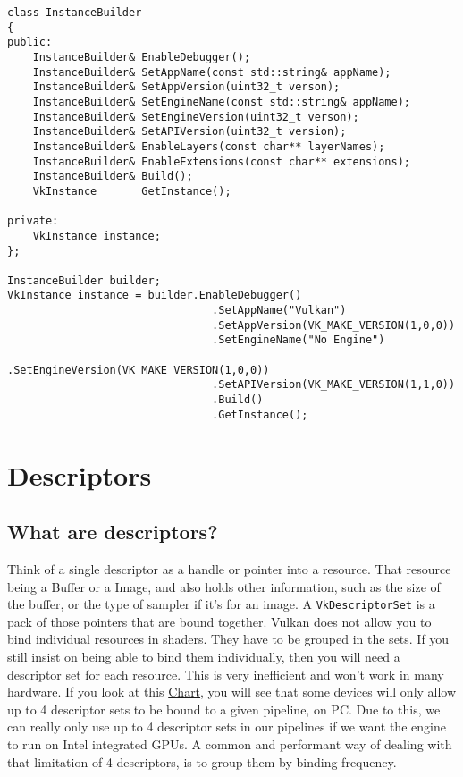 \documentclass[12pt]{article}
\begin{document}
	\begin{lstlisting}[style=customcpp]
class InstanceBuilder
{
public:
	InstanceBuilder& EnableDebugger();
	InstanceBuilder& SetAppName(const std::string& appName);
	InstanceBuilder& SetAppVersion(uint32_t verson);
	InstanceBuilder& SetEngineName(const std::string& appName);
	InstanceBuilder& SetEngineVersion(uint32_t verson);
	InstanceBuilder& SetAPIVersion(uint32_t version);
	InstanceBuilder& EnableLayers(const char** layerNames);
	InstanceBuilder& EnableExtensions(const char** extensions);
	InstanceBuilder& Build();
	VkInstance       GetInstance();

private:
	VkInstance instance;
};

InstanceBuilder builder;
VkInstance instance = builder.EnableDebugger()
								.SetAppName("Vulkan")
								.SetAppVersion(VK_MAKE_VERSION(1,0,0))
								.SetEngineName("No Engine")
								.SetEngineVersion(VK_MAKE_VERSION(1,0,0))
								.SetAPIVersion(VK_MAKE_VERSION(1,1,0))
								.Build()
								.GetInstance();
	\end{lstlisting}

	\newpage
	\section{Descriptors}
	\subsection{What are descriptors?}
	Think of a single descriptor as a handle or pointer into a resource. That resource being a Buffer or a Image, and also holds other information, such as the size of the buffer, or the type of sampler if it's for an image. A \texttt{VkDescriptorSet} is a pack of those pointers that are bound together. Vulkan does not allow you to bind individual resources in shaders. They have to be grouped in the sets. If you still insist on being able to bind them individually, then you will need a descriptor set for each resource. This is very inefficient and won't work in many hardware. If you look at this \href{https://vulkan.gpuinfo.org/displaydevicelimit.php?name=maxBoundDescriptorSets&platform=windows}{Chart}, you will see that some devices will only allow up to 4 descriptor sets to be bound to a given pipeline, on PC. Due to this, we can really only use up to 4 descriptor sets in our pipelines if we want the engine to run on Intel integrated GPUs. A common and performant way of dealing with that limitation of 4 descriptors, is to group them by binding frequency.
\end{document}
